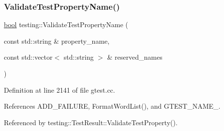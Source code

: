 \subsubsection{\texorpdfstring{Validate\+Test\+Property\+Name()}{ValidateTestPropertyName()}}
{\footnotesize\ttfamily \hyperlink{classbool}{bool} testing\+::\+Validate\+Test\+Property\+Name (\begin{DoxyParamCaption}\item[{const std\+::string \&}]{property\+\_\+name,  }\item[{const std\+::vector$<$ std\+::string $>$ \&}]{reserved\+\_\+names }\end{DoxyParamCaption})}



Definition at line 2141 of file gtest.\+cc.



References A\+D\+D\+\_\+\+F\+A\+I\+L\+U\+RE, Format\+Word\+List(), and G\+T\+E\+S\+T\+\_\+\+N\+A\+M\+E\+\_\+.



Referenced by testing\+::\+Test\+Result\+::\+Validate\+Test\+Property().


